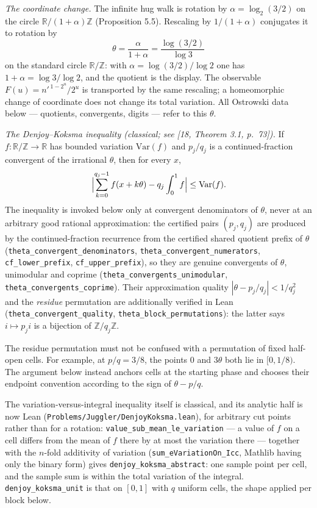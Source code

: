 \documentclass[12pt]{article}
\begin{document}
\emph{The coordinate change.} The infinite hug walk is rotation by
\(\alpha=\log_2(3/2)\) on the circle \(\mathbb R/(1+\alpha)\mathbb Z\)
(Proposition 5.5). Rescaling by \(1/(1+\alpha)\) conjugates it to
rotation by \[
\theta=\frac{\alpha}{1+\alpha}
=\frac{\log(3/2)}{\log 3}
\] on the standard circle \(\mathbb R/\mathbb Z\): with
\(\alpha=\log(3/2)/\log 2\) one has \(1+\alpha=\log 3/\log 2\), and the
quotient is the display. The observable \(F(u)=n'^{\,1-2^u}/2^u\) is
transported by the same rescaling; a homeomorphic change of coordinate
does not change its total variation. All Ostrowski data below ---
quotients, convergents, digits --- refer to this \(\theta\).

\emph{The Denjoy--Koksma inequality (classical; see {[}18, Theorem 3.1,
p.~73{]}).} If \(f:\mathbb R/\mathbb Z\to\mathbb R\) has bounded
variation \(\mathrm{Var}(f)\) and \(p_j/q_j\) is a continued-fraction
convergent of the irrational \(\theta\), then for every \(x\), \[
\Bigl|\sum_{k=0}^{q_j-1}f(x+k\theta)-q_j\int_0^1 f\Bigr|
\le\mathrm{Var}(f).
\] The inequality is invoked below only at convergent denominators of
\(\theta\), never at an arbitrary good rational approximation: the
certified pairs \((p_j,q_j)\) are produced by the continued-fraction
recurrence from the certified shared quotient prefix of \(\theta\)
(\texttt{\nolinkurl{theta_convergent_denominators}},
\texttt{\nolinkurl{theta_convergent_numerators}},
\texttt{\nolinkurl{cf_lower_prefix}},
\texttt{\nolinkurl{cf_upper_prefix}}), so they are genuine convergents
of \(\theta\), unimodular and coprime
(\texttt{\nolinkurl{theta_convergents_unimodular}},
\texttt{\nolinkurl{theta_convergents_coprime}}). Their approximation
quality \(|\theta-p_j/q_j|<1/q_j^2\) and the \emph{residue} permutation
are additionally verified in Lean
(\texttt{\nolinkurl{theta_convergent_quality}},
\texttt{\nolinkurl{theta_block_permutations}}): the latter says
\(i\mapsto p_ji\) is a bijection of \(\mathbb Z/q_j\mathbb Z\).

The residue permutation must not be confused with a permutation of fixed
half-open cells. For example, at \(p/q=3/8\), the points \(0\) and
\(3\theta\) both lie in \([0,1/8)\). The argument below instead anchors
cells at the starting phase and chooses their endpoint convention
according to the sign of \(\theta-p/q\).

The variation-versus-integral inequality itself is classical, and its
analytic half is now Lean
(\texttt{\nolinkurl{Problems/Juggler/DenjoyKoksma.lean}}), for arbitrary
cut points rather than for a rotation:
\texttt{\nolinkurl{value_sub_mean_le_variation}} --- a value of \(f\) on
a cell differs from the mean of \(f\) there by at most the variation
there --- together with the \(n\)-fold additivity of variation
(\texttt{\nolinkurl{sum_eVariationOn_Icc}}, Mathlib having only the
binary form) gives \texttt{\nolinkurl{denjoy_koksma_abstract}}: one
sample point per cell, and the sample sum is within the total variation
of the integral. \texttt{\nolinkurl{denjoy_koksma_unit}} is that on
\([0,1]\) with \(q\) uniform cells, the shape applied per block below.
\end{document}
